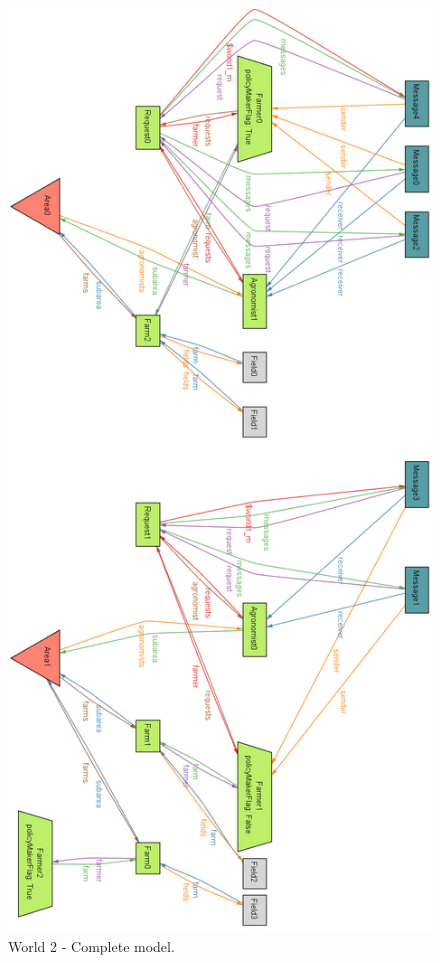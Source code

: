 \begin{figure}[H]
\centering
\includegraphics[scale=0.34]{../AlloyCode/ExportWorldPNG/world2_farmer_agro_requests.png}
\caption{\label{fig:alloyExecution}World 2 - Complete model.}
\end{figure}

